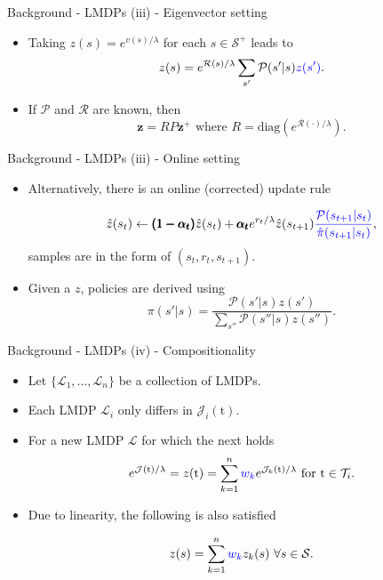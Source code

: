 \documentclass{beamer}
\theoremstyle{mystyle}
\newcommand{\tS}{\text{t}}   %
\newcommand{\cJ}{\mathcal{J}}
\newcommand{\cL}{\mathcal{L}}
\newcommand{\cP}{\mathcal{P}}
\newcommand{\cR}{\mathcal{R}}
\newcommand{\cS}{\mathcal{S}}
\newcommand{\cT}{\mathcal{T}}
\begin{document}
\begin{frame}{Background - LMDPs (iii) - Eigenvector setting}
    
    \begin{itemize}
         \item Taking $z(s)=e^{v(s)/\lambda}$ for each $s\in\cS^+$ leads to \[ z(s) = e^{\cR(s)/\lambda} \sum_{s'}\cP(s'|s){\color{blue}z(s')}. \]
         \item If $\cP$ and $\cR$ are known, then \[ \mathbf{z} = R P \mathbf{z^+} \text{  where  } R=\text{diag}(e^{\cR(\cdot)/\lambda}) .\]
        \end{itemize}
\end{frame}

\begin{frame}{Background - LMDPs (iii) - Online setting}

\begin{itemize}
\item Alternatively, there is an online {\color{blue} (corrected)} update rule  
        
         \[ \hat{z}(s_t) \leftarrow {\pmb{(1-\alpha_t)}} \hat{z}(s_t) + {\pmb{\alpha_t}} e^{r_t/\lambda}\hat{z}(s_{t+1}) {\color{blue} \frac {\cP(s_{t+1}|s_t)} {\hat{\pi}(s_{t+1}|s_t)}}, \]
samples are in the form of $(s_t, r_t, s_{t+1})$.        
\item Given a $z$, policies are derived using \[ \pi(s'|s) = \frac {\cP(s'|s)z(s')} {\sum_{s''} \cP(s''|s)z(s'')}.\]
\end{itemize}
\end{frame}

\begin{frame}{Background - LMDPs (iv) - Compositionality}
    \begin{itemize}
    \item Let $\{\cL_1,\ldots,\cL_n\}$ be a collection of LMDPs. 
   
    \item Each LMDP $\cL_i$ {\color{blue} only differs in $\cJ_i(\tS)$}.
    
    \item For a new LMDP $\cL$ for which the next holds~\citep{TodorovNIPS2009} 
    \begin{equation*}
        e^{\cJ(\tS)/\lambda} = z(\tS) = \sum_{k=1}^n {\color{blue} w_k} e^{\cJ_k(\tS)/\lambda} \ \text{for} \ \tS \in \cT_i.
    \end{equation*}
    
    \item Due to linearity, the following is also satisfied
    
    \begin{equation*}
       z(s) =  \sum_{k=1}^n {\color{blue} w_k} z_k(s) \ \forall s \in \cS.
    \end{equation*}
    
    \end{itemize}
    
\end{frame}
\end{document}
